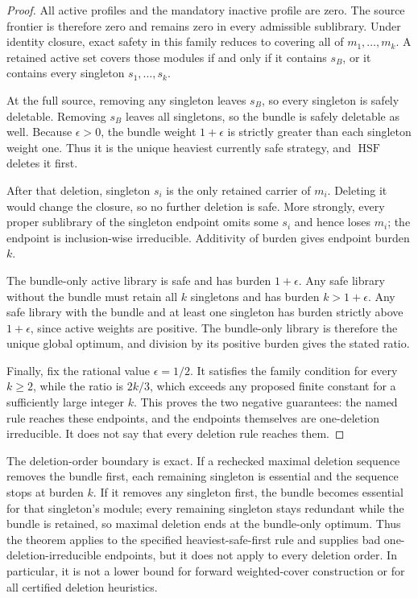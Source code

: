 \begin{proof}
All active profiles and the mandatory inactive profile are zero.  The source
frontier is therefore zero and remains zero in every admissible sublibrary.
Under identity closure, exact safety in this family reduces to covering all
of \(m_1,\ldots,m_k\).  A retained active set covers those modules if and only
if it contains \(s_B\), or it contains every singleton
\(s_1,\ldots,s_k\).

At the full source, removing any singleton leaves \(s_B\), so every
singleton is safely deletable.  Removing \(s_B\) leaves all singletons, so
the bundle is safely deletable as well.  Because \(\epsilon>0\), the bundle
weight \(1+\epsilon\) is strictly greater than each singleton weight one.
Thus it is the unique heaviest currently safe strategy, and
\(\operatorname{HSF}\) deletes it first.

After that deletion, singleton \(s_i\) is the only retained carrier of
\(m_i\).  Deleting it would change the closure, so no further deletion is
safe.  More strongly, every proper sublibrary of the singleton endpoint omits
some \(s_i\) and hence loses \(m_i\); the endpoint is inclusion-wise
irreducible.  Additivity of burden gives endpoint burden \(k\).

The bundle-only active library is safe and has burden \(1+\epsilon\).  Any
safe library without the bundle must retain all \(k\) singletons and has
burden \(k>1+\epsilon\).  Any safe library with the bundle and at least one
singleton has burden strictly above \(1+\epsilon\), since active weights are
positive.  The bundle-only library is therefore the unique global optimum,
and division by its positive burden gives the stated ratio.

Finally, fix the rational value \(\epsilon=1/2\).  It satisfies the family
condition for every \(k\geq2\), while the ratio is \(2k/3\), which exceeds
any proposed finite constant for a sufficiently large integer \(k\).  This
proves the two negative guarantees: the named rule reaches these endpoints,
and the endpoints themselves are one-deletion irreducible.  It does not say
that every deletion rule reaches them.
\end{proof}

The deletion-order boundary is exact.  If a rechecked maximal deletion
sequence removes the bundle first, each remaining singleton is essential and
the sequence stops at burden \(k\).  If it removes any singleton first, the
bundle becomes essential for that singleton's module; every remaining
singleton stays redundant while the bundle is retained, so maximal deletion
ends at the bundle-only optimum.  Thus the theorem applies to the specified
heaviest-safe-first rule and supplies bad one-deletion-irreducible endpoints,
but it does not apply to every deletion order.  In particular, it is not a
lower bound for forward weighted-cover construction or for all certified
deletion heuristics.

